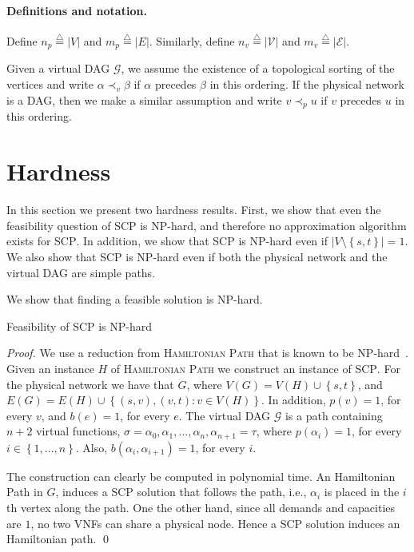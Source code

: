 \documentclass[runningheads]{llncs}
\newcommand{\eqdf}{\stackrel{\scriptscriptstyle \triangle}{=}}
\newcommand{\set}[1]{\left\{ #1 \right\}}
\newcommand{\abs}[1]{\left| #1 \right|}
\newcommand{\scp}{\textsc{SCP}\xspace}
\newcommand{\calE}{\mathcal{E}}
\newcommand{\calG}{\mathcal{G}}
\newcommand{\calV}{\mathcal{V}}
\begin{document}

\paragraph*{\bf Definitions and notation.}
%
Define $n_p \eqdf \abs{V}$ and $m_p \eqdf \abs{E}$.  Similarly, define
$n_v \eqdf \abs{\calV}$ and $m_v \eqdf \abs{\calE}$.

Given a virtual DAG $\calG$, we assume the existence of a topological
sorting of the vertices and write $\alpha \prec_v \beta$ if $\alpha$
precedes $\beta$ in this ordering.  If the physical network is a DAG,
then we make a similar assumption and write $v \prec_p u$ if $v$
precedes $u$ in this ordering.





\section{Hardness}

In this section we present two hardness results.  First, we show that
even the feasibility question of \scp is NP-hard, and therefore no
approximation algorithm exists for \scp.  In addition, we show that
\scp is NP-hard even if $\abs{V \setminus \set{s,t}} = 1$.  We also
show that \scp is NP-hard even if both the physical network and the
virtual DAG are simple paths.

We show that finding a feasible solution is NP-hard.

\begin{theorem}
Feasibility of \scp is NP-hard
\end{theorem}
\begin{proof}
We use a reduction from \textsc{Hamiltonian Path} that is known to be
NP-hard~\cite{GarJoh79}.
%
Given an instance $H$ of \textsc{Hamiltonian Path} we construct an
instance of \scp.  For the physical network we have that $G$, where
$V(G) = V(H) \cup \set{s,t}$, and $E(G) = E(H) \cup \set{(s,v),(v,t) :
  v \in V(H)}$.  In addition, $p(v) = 1$, for every $v$, and $b(e) =
1$, for every $e$.  The virtual DAG $\calG$ is a path containing $n+2$
virtual functions, $\sigma = \alpha_0, \alpha_1, \ldots, \alpha_n,
\alpha_{n+1} = \tau$, where $p(\alpha_i) = 1$, for every $i \in
\set{1,\ldots,n}$.  Also, $b(\alpha_i,\alpha_{i+1}) = 1$, for every
$i$.

The construction can clearly be computed in polynomial time.
%
An Hamiltonian Path in $G$, induces a \scp solution that follows the
path, i.e., $\alpha_i$ is placed in the $i$th vertex along the path.
%
One the other hand, since all demands and capacities are $1$, no two
VNFs can share a physical node.  Hence a \scp solution induces an
Hamiltonian path.
%
\qed
\end{proof}
\end{document}

